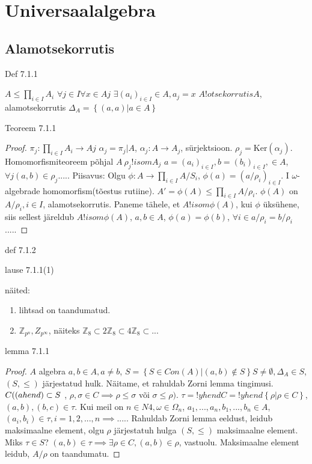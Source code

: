 \documentclass[12pt]{report}
\numberwithin{equation}{section}
\theoremstyle{definition}
\theoremstyle{plain}
\begin{document}
\section{Universaalalgebra}
\subsection{Alamotsekorrutis}
Def 7.1.1

$A \leq \prod \limits_{i \in I} A_i$
$\forall j \in I \forall x \in Aj$
$\exists (a_i)_{i \in I} \in A, a_j = x$
$A !otsekorrutis A$, alamotsekorrutis $\Delta_A = \left\lbrace (a,a) | a \in A \right\rbrace$

Teoreem 7.1.1

\begin{proof}
$\pi_j : \prod_{i \in I} A_i \to Aj$
$\alpha_j = \pi_j | A$, $\alpha_j: A \to A_j$, sürjektsioon.
$\rho_j = \text{Ker}(\alpha_j)$. 
Homomorfismiteoreem põhjal $A \ \rho_j !isom A_j$
$a = (a_i)_{i \in I}, b = (b_i)_{i \in I}, \in A$, $\forall j (a,b) \in \rho_j$.....
Piisavus: Olgu $\phi: A \to \prod \limits_{i \in I} A / S_i$, $\phi(a) = (a / \rho_i)_{i \in I}$. I $\omega$- algebrade homomorfism(tõestus rutiine). $A' = \phi(A) \leq \prod_{i \in I} A / \rho_i $. $\phi(A)$ on $A/ \rho_i, i \in I$, alamotsekorrutis. Paneme tähele, et $A !isom \phi(A)$, kui $\phi$ \"uks\"uhene, siis sellest järeldub $A !isom \phi(A)$, $a,b \in A$, $\phi(a) = \phi(b)$, $\forall i \in a/ \rho_i =b / \rho_i$.....
\end{proof}

def 7.1.2

lause 7.1.1(1)

näited:
\begin{enumerate}
\item lihtsad on taandumatud.
\item $\mathbb{Z}_{p^n}, Z_{p^\infty}$, näiteks $\mathbb{Z}_8  \subset 2 \mathbb{Z}_{8} \subset 4 \mathbb{Z}_8 \subset ...$
\end{enumerate}

lemma 7.1.1

\begin{proof}
$A$ algebra
$a,b \in A, a \neq b$,
$S = \left\lbrace S \in Con(A) | (a,b) \not \in S \right\rbrace
S \neq \emptyset, \Delta_A \in S$, $(S, \leq) $ järjestatud hulk. Näitame, et rahuldab Zorni lemma tingimusi. $C (\text(ahend) \subset S$ , $\rho,\sigma \in C \implies \rho \leq \sigma $ või $ \sigma \leq \rho)$. $\tau = !yhendC = !yhend \left\lbrace \rho | \rho \in C \right\rbrace$, $(a,b),(b,c) \in \tau$. Kui meil on $n \in N4, \omega \in \Omega_n$, $a_1,...,a_n,b_1,...,b_n \in A$, $(a_i, b_i ) \in \tau, i = 1,2,...,n \implies ....$. Rahuldab Zorni lemma eeldust, leidub maksimaalne element, olgu $\rho$ järjestatuh hulga $(S,\leq)$ maksimaalne element. Miks $\tau \in S$? $(a,b) \in \tau \implies \exists \rho \in C, (a,b) \in \rho$, vastuolu. 
Maksimaalne element leidub, $A/ \rho $ on taandumatu. 



\end{proof}
\end{document}
